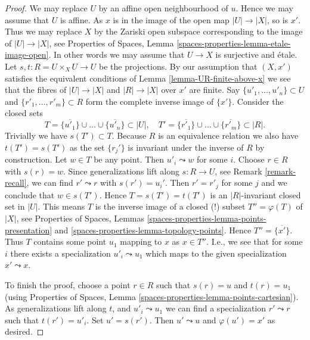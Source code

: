 \documentclass{stacks-project}
\theoremstyle{plain}
\theoremstyle{definition}
\theoremstyle{remark}
\numberwithin{equation}{subsection}
\begin{document}
\begin{proof}
We may replace $U$ by an affine open neighbourhood of $u$.
Hence we may assume that $U$ is affine. As $x$ is in the
image of the open map $|U| \to |X|$, so is $x'$. Thus we may
replace $X$ by the Zariski open subspace corresponding to
the image of $|U| \to |X|$, see
Properties of Spaces,
Lemma \ref{spaces-properties-lemma-etale-image-open}.
In other words we may assume that
$U \to X$ is surjective and \'etale.
Let $s, t : R = U \times_X U \to U$ be the projections.
By our assumption that $(X, x')$ satisfies the equivalent conditions of
Lemma \ref{lemma-UR-finite-above-x}
we see that the fibres of $|U| \to |X|$ and $|R| \to |X|$
over $x'$ are finite. Say $\{u'_1, \ldots, u'_n\} \subset U$ and
$\{r'_1, \ldots, r'_m\} \subset R$ form the complete inverse image
of $\{x'\}$.
Consider the closed sets
$$
T = \overline{\{u'_1\}} \cup \ldots \cup \overline{\{u'_n\}} \subset |U|,
\quad
T' = \overline{\{r'_1\}} \cup \ldots \cup \overline{\{r'_m\}} \subset |R|.
$$
Trivially we have $s(T') \subset T$. Because $R$ is an equivalence
relation we also have $t(T') = s(T')$ as the set $\{r_j'\}$
is invariant under the inverse of $R$ by construction. Let $w \in T$
be any point. Then $u'_i \leadsto w$ for some $i$. Choose $r \in R$
with $s(r) = w$. Since generalizations lift along $s : R \to U$, see
Remark \ref{remark-recall}, we can find $r' \leadsto r$ with
$s(r') = u_i'$. Then $r' = r'_j$ for some $j$ and we conclude that
$w \in s(T')$. Hence $T = s(T') = t(T')$ is an $|R|$-invariant closed
set in $|U|$. This means $T$ is the inverse image of a closed (!)
subset $T'' = \varphi(T)$ of $|X|$, see
Properties of Spaces,
Lemmas \ref{spaces-properties-lemma-points-presentation} and
\ref{spaces-properties-lemma-topology-points}.
Hence $T'' = \overline{\{x'\}}$.
Thus $T$ contains some point $u_1$ mapping to $x$ as $x \in T''$.
I.e., we see that for some $i$ there exists a specialization
$u'_i \leadsto u_1$ which maps to the given specialization
$x' \leadsto x$.

\medskip\noindent
To finish the proof, choose a point $r \in R$ such that
$s(r) = u$ and $t(r) = u_1$ (using
Properties of Spaces,
Lemma \ref{spaces-properties-lemma-points-cartesian}).
As generalizations lift along $t$, and $u'_i \leadsto u_1$
we can find a specialization $r' \leadsto r$ such that $t(r') = u'_i$.
Set $u' = s(r')$. Then $u' \leadsto u$ and $\varphi(u') = x'$ as
desired.
\end{proof}
\end{document}
